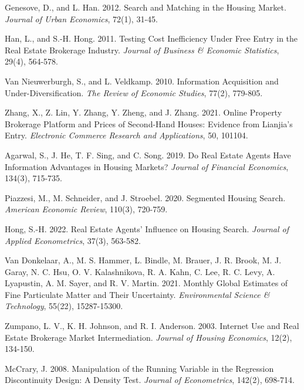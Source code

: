 \documentclass[11pt]{article}
\begin{document}
\begin{singlespace}
\begin{thebibliography}{}
  Genesove, D., and L. Han. 2012. Search and Matching in the Housing Market. \textit{Journal of Urban Economics}, 72(1), 31-45.
  
  Han, L., and S.-H. Hong. 2011. Testing Cost Inefficiency Under Free Entry in the Real Estate Brokerage Industry. \textit{Journal of Business \& Economic Statistics}, 29(4), 564-578.
  
  Van Nieuwerburgh, S., and L. Veldkamp. 2010. Information Acquisition and Under-Diversification. \textit{The Review of Economic Studies}, 77(2), 779-805.
  
  Zhang, X., Z. Lin, Y. Zhang, Y. Zheng, and J. Zhang. 2021. Online Property Brokerage Platform and Prices of Second-Hand Houses: Evidence from Lianjia’s Entry. \textit{Electronic Commerce Research and Applications}, 50, 101104.
  
  Agarwal, S., J. He, T. F. Sing, and C. Song. 2019. Do Real Estate Agents Have Information Advantages in Housing Markets? \textit{Journal of Financial Economics}, 134(3), 715-735.
  
  Piazzesi, M., M. Schneider, and J. Stroebel. 2020. Segmented Housing Search. \textit{American Economic Review}, 110(3), 720-759.
  
  Hong, S.-H. 2022. Real Estate Agents' Influence on Housing Search. \textit{Journal of Applied Econometrics}, 37(3), 563-582.
  
  Van Donkelaar, A., M. S. Hammer, L. Bindle, M. Brauer, J. R. Brook, M. J. Garay, N. C. Hsu, O. V. Kalashnikova, R. A. Kahn, C. Lee, R. C. Levy, A. Lyapustin, A. M. Sayer, and R. V. Martin. 2021. Monthly Global Estimates of Fine Particulate Matter and Their Uncertainty. \textit{Environmental Science \& Technology}, 55(22), 15287-15300.
  
  Zumpano, L. V., K. H. Johnson, and R. I. Anderson. 2003. Internet Use and Real Estate Brokerage Market Intermediation. \textit{Journal of Housing Economics}, 12(2), 134-150.
  
  McCrary, J. 2008. Manipulation of the Running Variable in the Regression Discontinuity Design: A Density Test. \textit{Journal of Econometrics}, 142(2), 698-714.
  

\end{thebibliography}
\end{singlespace}
\end{document}
